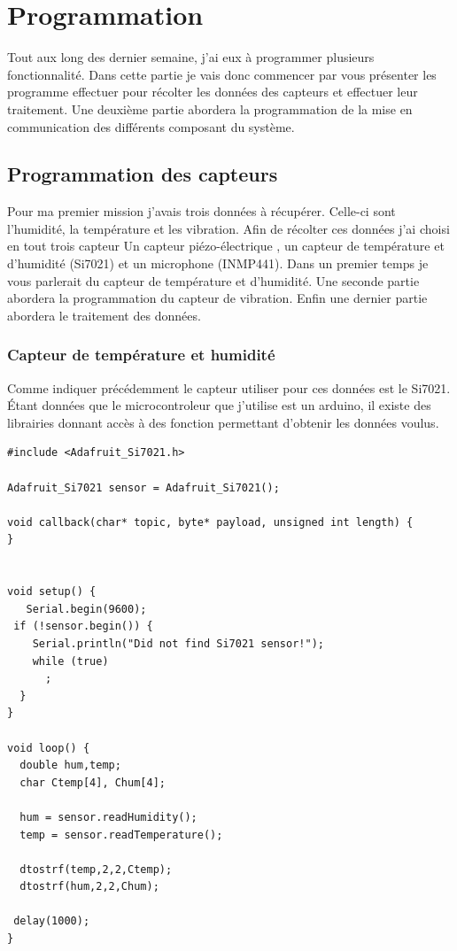 \documentclass[11pt,french,a4paper]{article}
\begin{document}
\section{Programmation}
Tout aux long des dernier semaine, j'ai eux à programmer plusieurs fonctionnalité. Dans cette partie je vais donc commencer par vous présenter les programme effectuer pour récolter les données des capteurs et effectuer leur traitement. Une deuxième partie abordera la programmation de la mise en communication des différents composant du système.
\subsection{Programmation des capteurs}
Pour ma premier mission j'avais trois  données à récupérer. Celle-ci sont l'humidité, la température et les vibration. Afin de récolter ces données j'ai choisi en tout trois capteur Un capteur piézo-électrique , un capteur de température et d'humidité (Si7021) et un microphone (INMP441). Dans un premier temps je vous parlerait du capteur de température et d'humidité. Une seconde partie abordera la programmation du capteur de vibration. Enfin une dernier partie abordera le traitement des données.  

\subsubsection{Capteur de température et humidité}
Comme indiquer précédemment le capteur utiliser pour ces données est le Si7021. Étant données que le microcontroleur que j'utilise est un arduino, il existe des librairies donnant accès à des fonction permettant d'obtenir les données voulus.
\begin{scriptsize}
	\begin{lstlisting}
#include <Adafruit_Si7021.h>

Adafruit_Si7021 sensor = Adafruit_Si7021();

void callback(char* topic, byte* payload, unsigned int length) {
}


void setup() {
   Serial.begin(9600);
 if (!sensor.begin()) {
    Serial.println("Did not find Si7021 sensor!");
    while (true)
      ;
  }
}
 
void loop() {
  double hum,temp;
  char Ctemp[4], Chum[4];

  hum = sensor.readHumidity();
  temp = sensor.readTemperature();
  
  dtostrf(temp,2,2,Ctemp);
  dtostrf(hum,2,2,Chum);

 delay(1000);
}	
	\end{lstlisting}
\end{scriptsize}
\end{document}
